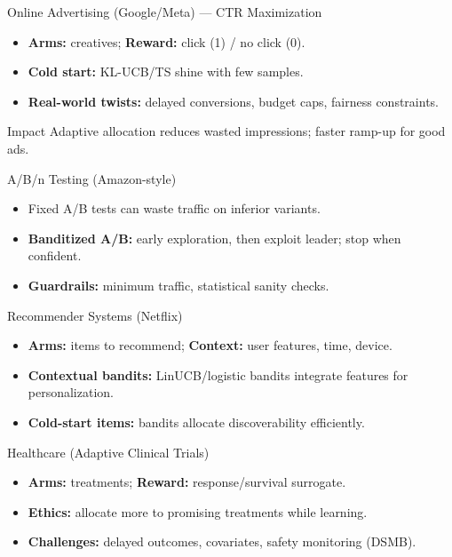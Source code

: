 \documentclass[aspectratio=169]{beamer}
\begin{document}
\begin{frame}{Online Advertising (Google/Meta) — CTR Maximization}
\small
\begin{itemize}
  \item \textbf{Arms:} creatives; \textbf{Reward:} click (1) / no click (0).
  \item \textbf{Cold start:} KL-UCB/TS shine with few samples.
  \item \textbf{Real-world twists:} delayed conversions, budget caps, fairness constraints.
\end{itemize}
\begin{block}{Impact}
Adaptive allocation reduces wasted impressions; faster ramp-up for good ads.
\end{block}
\end{frame}

\begin{frame}{A/B/n Testing (Amazon-style)}
\small
\begin{itemize}
  \item Fixed A/B tests can waste traffic on inferior variants.
  \item \textbf{Banditized A/B:} early exploration, then exploit leader; stop when confident.
  \item \textbf{Guardrails:} minimum traffic, statistical sanity checks.
\end{itemize}
\end{frame}

\begin{frame}{Recommender Systems (Netflix)}
\small
\begin{itemize}
  \item \textbf{Arms:} items to recommend; \textbf{Context:} user features, time, device.
  \item \textbf{Contextual bandits:} LinUCB/logistic bandits integrate features for personalization.
  \item \textbf{Cold-start items:} bandits allocate discoverability efficiently.
\end{itemize}
\end{frame}

\begin{frame}{Healthcare (Adaptive Clinical Trials)}
\small
\begin{itemize}
  \item \textbf{Arms:} treatments; \textbf{Reward:} response/survival surrogate.
  \item \textbf{Ethics:} allocate more to promising treatments while learning.
  \item \textbf{Challenges:} delayed outcomes, covariates, safety monitoring (DSMB).
\end{itemize}
\end{frame}
\end{document}
